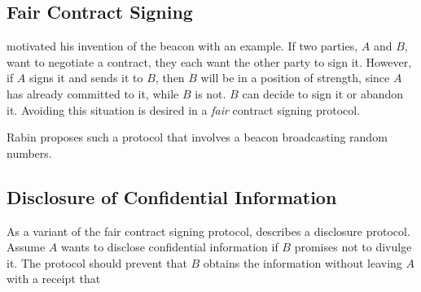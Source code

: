\subsection{Fair Contract Signing}\label{subsec:fair_contract_signing}
\citet{rabin1983transaction} motivated his invention of the beacon with an example. If two parties, $A$ and $B$, want to negotiate a contract, they each want the other party to sign it. 
However, if $A$ signs it and sends it to $B$, then $B$ will be in a position of strength, since $A$ has already committed to it, while $B$ is not. $B$ can decide to sign it or abandon it. Avoiding this situation is desired in a \emph{fair} contract signing protocol.

Rabin proposes such a protocol that involves a beacon broadcasting random numbers. 



\subsection{Disclosure of Confidential Information}
As a variant of the fair contract signing protocol, \citet{rabin1983transaction} describes a disclosure protocol. Assume $A$ wants to disclose confidential information if $B$ promises not to divulge it. The protocol should prevent that $B$ obtains the information without leaving $A$ with a receipt that 